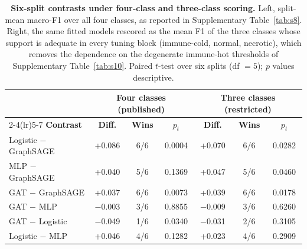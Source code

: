 \documentclass[11pt,letterpaper]{article}
\begin{document}
\begin{table}[H]
\centering
\caption{\textbf{Six-split contrasts under four-class and three-class scoring.} Left, split-mean macro-F1 over all four classes, as reported in Supplementary Table~\ref{tab:s8}. Right, the same fitted models rescored as the mean F1 of the three classes whose support is adequate in every tuning block (immune-cold, normal, necrotic), which removes the dependence on the degenerate immune-hot thresholds of Supplementary Table~\ref{tab:s10}. Paired $t$-test over six splits (df $= 5$); $p$ values descriptive.}
\label{tab:s11}
\small
\begin{tabular}{lcccccc}
\toprule
 & \multicolumn{3}{c}{\textbf{Four classes (published)}} & \multicolumn{3}{c}{\textbf{Three classes (restricted)}} \\
\cmidrule(lr){2-4}\cmidrule(lr){5-7}
\textbf{Contrast} & \textbf{Diff.} & \textbf{Wins} & $p_t$ & \textbf{Diff.} & \textbf{Wins} & $p_t$ \\
\midrule
Logistic $-$ GraphSAGE & +0.086 & 6/6 & 0.0004 & +0.070 & 6/6 & 0.0282 \\
MLP $-$ GraphSAGE & +0.040 & 5/6 & 0.1369 & +0.047 & 5/6 & 0.0460 \\
GAT $-$ GraphSAGE & +0.037 & 6/6 & 0.0073 & +0.039 & 6/6 & 0.0178 \\
GAT $-$ MLP & $-$0.003 & 3/6 & 0.8855 & $-$0.009 & 3/6 & 0.6260 \\
GAT $-$ Logistic & $-$0.049 & 1/6 & 0.0340 & $-$0.031 & 2/6 & 0.3105 \\
Logistic $-$ MLP & +0.046 & 4/6 & 0.1282 & +0.023 & 4/6 & 0.2909 \\
\bottomrule
\end{tabular}
\end{table}

\vspace{1.5em}
\end{document}
